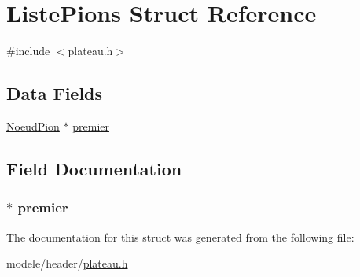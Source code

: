 \hypertarget{struct_liste_pions}{\section{Liste\-Pions Struct Reference}
\label{struct_liste_pions}
}


{\ttfamily \#include $<$plateau.\-h$>$}

\subsection*{Data Fields}
\begin{DoxyCompactItemize}
\item 
\hyperlink{struct_noeud_pion}{Noeud\-Pion} $\ast$ \hyperlink{struct_liste_pions_a2e99b1d7a7905fa220361a7843ade562}{premier}
\end{DoxyCompactItemize}


\subsection{Field Documentation}
\hypertarget{struct_liste_pions_a2e99b1d7a7905fa220361a7843ade562}{
\subsubsection[{premier}]{$\ast$ premier}}\label{struct_liste_pions_a2e99b1d7a7905fa220361a7843ade562}


The documentation for this struct was generated from the following file\-:\begin{DoxyCompactItemize}
\item 
modele/header/\hyperlink{plateau_8h}{plateau.\-h}\end{DoxyCompactItemize}
